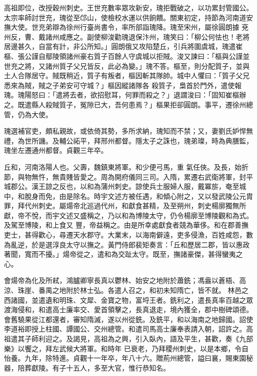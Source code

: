 \begin{pinyinscope}
 高祖即位，改授穀州刺史。王世充數率眾攻新安，瑰拒戰破之，以功累封管國公。太宗率師討世充，瑰從至邙山，使檢校水運以供餉饋。關東初定，持節為河南道安撫大使。世充弟辯為徐州行臺尚書令，率所部詣瑰降。瑰至宋州，屬徐圓朗據
 兗州反，曹、戴諸州咸應之。副使柳浚勸瑰退保汴州，瑰笑曰：「柳公何怯也！老將居邊甚久，自當有計，非公所知。」圓朗俄又攻陷楚丘，引兵將圍虞城，瑰遣崔樞、張公謹自鄢陵領諸州豪右質子百餘人守虞城以拒賊。浚又諫曰：「樞與公謹並世充之將，又諸州質子父兄皆反，此必為變。」瑰不答。樞至，則分配質子，並與土人合隊居守。賊既稍近，質子有叛者，樞因斬其隊帥。城中人懼曰：「質子父兄悉來為賊，賊之子弟安可守城？」樞因縱諸隊各
 殺質子，梟首於門外，遣使報瑰。瑰陽怒曰：「遣將去者，欲招慰耳，何罪而殺之？」退謂浚曰：「固知崔樞辦之。既遣縣人殺賊質子，冤隙已大，吾何患焉？」樞果拒卻圓朗。事平，遷徐州總管，仍為大使。



 瑰選補官吏，頗私親故，或依倚其勢，多所求納，瑰知而不禁；又，妻劉氏妒悍無禮，為世所譏。及輔公祏平，拜邢州都督。隱太子之誅也，瑰弟璨，時為典膳監，瑰坐左遷通州都督。貞觀三年卒。



 丘和，河南洛陽人也。父壽，魏鎮東將軍。和少便弓馬，重
 氣任俠。及長，始折節，與物無忤，無貴賤皆愛之。周為開府儀同三司。入隋，累遷右武衛將軍，封平城郡公。漢王諒之反也，以和為蒲州刺史。諒使兵士服婦人服，戴冪旂，奄至城中，和脫身而免，由是除名。時宇文述方被任遇，和傾心附之，又以發武陵公元胄罪，拜代州刺史。屬煬帝北巡過代州，和獻食甚精，及至朔州，刺史楊廓獨無所獻，帝不悅，而宇文述又盛稱之，乃以和為博陵太守，仍令楊廓至博陵觀和為式。及駕至博陵，和上食又
 豐，帝益稱之。由是所幸處獻食者競為華侈。和在郡善撫吏士，甚得歡心，尋遷天水郡守。大業末，以海南僻遠，吏多侵漁，百姓咸怨，數為亂逆，於是選淳良太守以撫之。黃門侍郎裴矩奏言：「丘和歷居二郡，皆以惠政著聞，寬而不擾。」煬帝從之，遣和為交趾太守。既至，撫諸豪傑，甚得蠻夷之心。



 會煬帝為化及所弒，鴻臚卿寧長真以鬱林、始安之地附於蕭銑；馮盎以蒼梧、高涼、珠崖、番禺之地附於林士弘。各遣人召之，和初未知隋亡，皆不就。
 林邑之西諸國，並遣遺和明珠、文犀、金寶之物，富埒王者。銑利之，遣長真率百越之眾渡海侵和，和遣高士廉率交、愛首領擊之，長真退走，境內獲全，郡中樹碑頌德。會舊驍果從江都還者，審知隋滅，遂以州從銑。及銑平，和以海南之地歸國。詔使李道裕即授上柱國、譚國公、交州總管。和遣司馬高士廉奉表請入朝，詔許之。高祖遣其子師利迎之。及謁見，高祖為之興，引入臥內，語及平生，甚歡，奏《九部樂》以饗之，拜左武候大將軍。和時年
 已衰老，乃拜稷州刺史，以是本鄉，令自怡養。九年，除特進。貞觀十一年卒，年八十六。贈荊州總管，謚曰襄，賜東園秘器，陪葬獻陵。有子十五人，多至大官，惟行恭知名。




\end{pinyinscope}
